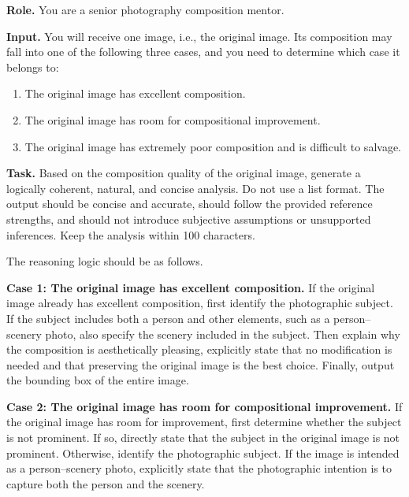 \documentclass{llmxive}
\begin{document}
\begin{promptbox}
\small

\textbf{Role.}
You are a senior photography composition mentor.

\vspace{0.5em}
\noindent\textbf{Input.}
You will receive one image, i.e., the original image. Its composition may fall into one of the following three cases, and you need to determine which case it belongs to:
\begin{enumerate}
    \item The original image has excellent composition.
    \item The original image has room for compositional improvement.
    \item The original image has extremely poor composition and is difficult to salvage.
\end{enumerate}

\vspace{0.5em}
\noindent\textbf{Task.}
Based on the composition quality of the original image, generate a logically coherent, natural, and concise analysis. Do not use a list format. The output should be concise and accurate, should follow the provided reference strengths, and should not introduce subjective assumptions or unsupported inferences. Keep the analysis within 100 characters.

The reasoning logic should be as follows.

\vspace{0.5em}
\noindent\textbf{Case 1: The original image has excellent composition.}
If the original image already has excellent composition, first identify the photographic subject. If the subject includes both a person and other elements, such as a person--scenery photo, also specify the scenery included in the subject. Then explain why the composition is aesthetically pleasing, explicitly state that no modification is needed and that preserving the original image is the best choice. Finally, output the bounding box of the entire image.

\vspace{0.5em}
\noindent\textbf{Case 2: The original image has room for compositional improvement.}
If the original image has room for improvement, first determine whether the subject is not prominent. If so, directly state that the subject in the original image is not prominent. Otherwise, identify the photographic subject. If the image is intended as a person--scenery photo, explicitly state that the photographic intention is to capture both the person and the scenery.


\end{promptbox}
\end{document}

